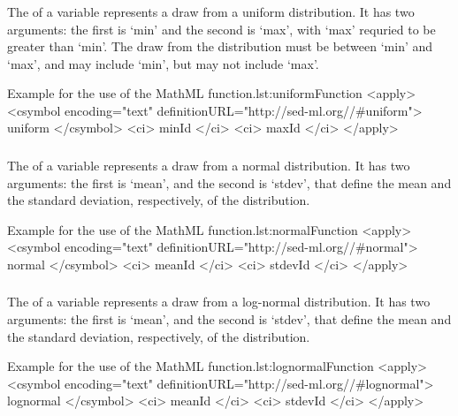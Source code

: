 \begin{blockChanged}
\subsubsection*{}
\label{fun:uniform}
The \uniform of a variable represents a draw from a uniform distribution.  It has two arguments:  the first is `min' and the second is `max', with `max' requried to be greater than `min'.  The draw from the distribution must be between `min' and `max', and may include `min', but may not include `max'.
\begin{myXmlLst}{Example for the use of the MathML  function.}{lst:uniformFunction}
<apply>
 	<csymbol encoding="text" definitionURL="http://sed-ml.org//#uniform">
 		uniform
 	</csymbol>
 	<ci> minId </ci>
 	<ci> maxId </ci>
</apply>
\end{myXmlLst}


\subsubsection*{}
\label{fun:normal}
The \normal of a variable represents a draw from a normal distribution.  It has two arguments:  the first is `mean', and the second is `stdev', that define the mean and the standard deviation, respectively, of the distribution.
\begin{myXmlLst}{Example for the use of the MathML  function.}{lst:normalFunction}
<apply>
 	<csymbol encoding="text" definitionURL="http://sed-ml.org//#normal">
 		normal
 	</csymbol>
 	<ci> meanId </ci>
 	<ci> stdevId </ci>
</apply>
\end{myXmlLst}


\subsubsection*{}
\label{fun:lognormal}
The \lognormal of a variable represents a draw from a log-normal distribution.  It has two arguments:  the first is `mean', and the second is `stdev', that define the mean and the standard deviation, respectively, of the distribution.
\begin{myXmlLst}{Example for the use of the MathML  function.}{lst:lognormalFunction}
<apply>
 	<csymbol encoding="text" definitionURL="http://sed-ml.org//#lognormal">
 		lognormal
 	</csymbol>
 	<ci> meanId </ci>
 	<ci> stdevId </ci>
</apply>
\end{myXmlLst}



\end{blockChanged}
